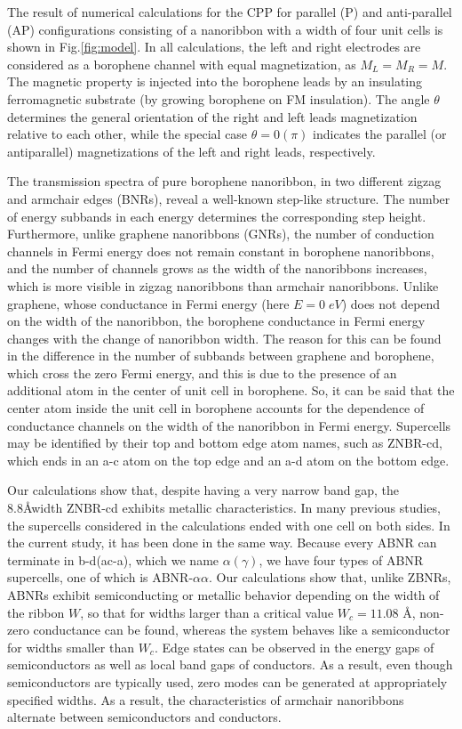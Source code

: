 \documentclass[twoside,twocolumn,9pt]{article}
\begin{document}
The result of numerical calculations for the CPP for parallel (P) and anti-parallel (AP) configurations consisting of a nanoribbon with a width of four unit cells is shown in Fig.\ref{fig:model}. In all calculations, the left and right electrodes are considered as a borophene channel with equal magnetization, as $M_L=M_R=M$. The magnetic property is injected into the borophene leads by an insulating ferromagnetic substrate (by growing borophene on FM insulation). The angle $\theta$ determines the general orientation of the right and left leads magnetization relative to each other, while the special case $\theta=0(\pi)$ indicates the parallel (or antiparallel) magnetizations of the left and right leads, respectively.

The transmission spectra of pure borophene nanoribbon, in two different zigzag and armchair edges (BNRs), reveal a well-known step-like structure. The number of energy subbands in each energy determines the corresponding step height. Furthermore, unlike graphene nanoribbons (GNRs), the number of conduction channels in Fermi energy does not remain constant in borophene nanoribbons\cite{gmitra2016trivial}, and the number of channels grows as the width of the nanoribbons increases, which is more visible in zigzag nanoribbons than armchair nanoribbons\cite{ezawa2017triplet}. Unlike graphene, whose conductance in Fermi energy (here $E= 0\;eV$) does not depend on the width of the nanoribbon, the borophene conductance in Fermi energy changes with the change of nanoribbon width. The reason for this can be found in the difference in the number of subbands between graphene and borophene, which cross the zero Fermi energy, and this is due to the presence of an additional atom in the center of unit cell in borophene. So, it can be said that the center atom inside the unit cell in borophene accounts for the dependence of conductance channels on the width of the nanoribbon in Fermi energy. Supercells may be identified by their top and bottom edge atom names, such as ZNBR-cd, which ends in an a-c atom on the top edge and an a-d atom on the bottom edge.

Our calculations show that, despite having a very narrow band gap, the 8.8\AA\;width ZNBR-cd exhibits metallic characteristics. In many previous studies, the supercells considered in the calculations ended with one cell on both sides\cite{feng2017dirac,ezawa2017triplet}. In the current study, it has been done in the same way. Because every ABNR can terminate in b-d(ac-a), which we name $\alpha(\gamma)$, we have four types of ABNR supercells, one of which is ABNR-$\alpha\alpha$. Our calculations show that, unlike ZBNRs, ABNRs exhibit semiconducting or metallic behavior depending on the width of the ribbon $W$, so that for widths larger than a critical value $W_c = 11.08$ \AA,\cite{nikan2022effects} non-zero conductance can be found, whereas the system behaves like a semiconductor for widths smaller than $W_c$. Edge states can be observed in the energy gaps of semiconductors as well as local band gaps of conductors. As a result, even though semiconductors are typically used, zero modes can be generated at appropriately specified widths\cite{brey2006electronic}. As a result, the characteristics of armchair nanoribbons alternate between semiconductors and conductors.
\end{document}
